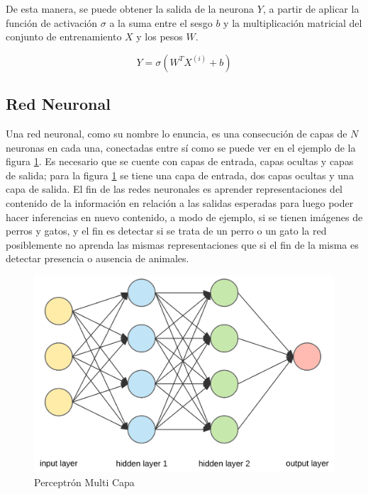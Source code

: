 De esta manera, se puede obtener la salida de la neurona \(Y\), a partir de aplicar la función de activación \(\sigma\) a la suma entre el sesgo \(b\) y la multiplicación matricial del conjunto de entrenamiento \(X\) y los pesos \(W\).

\begin{equation}
Y=\sigma\left(W^{T} X^{(i)}+b\right)
\end{equation}


\subsection{Red Neuronal}

 Una red neuronal, como su nombre lo enuncia, es una consecución de capas de \(N\) neuronas en cada una, conectadas entre sí como se puede ver en el ejemplo de la figura \ref{fig:redneuronal}. Es necesario que se cuente con capas de entrada, capas ocultas y capas de salida; para la figura \ref{fig:redneuronal} se tiene una capa de entrada, dos capas ocultas y una capa de salida. 
 El fin de las redes neuronales es aprender representaciones del contenido de la información en relación a las salidas esperadas para luego poder hacer inferencias en nuevo contenido, a modo de ejemplo, si se tienen imágenes de perros y gatos, y el fin es detectar si se trata de un perro o un gato la red posiblemente no aprenda las mismas representaciones que si el fin de la misma es detectar presencia o ausencia de animales.
 
 
 
 \begin{figure}
 	\centering
 	\includegraphics[width=0.7\linewidth]{images/red_neuronal}
 	\caption[Ejemplo red neuronal]{Perceptrón Multi Capa}
 	\label{fig:redneuronal}
 \end{figure}

